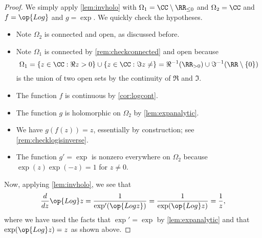 \begin{proof}
	We simply apply \autoref{lem:invholo} with $\Omega_1=\CC\setminus\RR_{\le0}$ and $\Omega_2=\CC$ and $f=\op{Log}$ and $g=\exp$. We quickly check the hypotheses.
	\begin{itemize}
		\item Note $\Omega_2$ is connected and open, as discussed before.
		\item Note $\Omega_1$ is connected by \autoref{rem:checkconnected} and open because
		\[\Omega_1=\{z\in\CC:\Re z>0\}\cup\{z\in\CC:\Im z\ne\}=\Re^{-1}(\RR_{>0})\cup\Im^{-1}(\RR\setminus\{0\})\]
		is the union of two open sets by the continuity of $\Re$ and $\Im$.
		\item The function $f$ is continuous by \autoref{cor:logcont}.
		\item The function $g$ is holomorphic on $\Omega_2$ by \autoref{lem:expanalytic}.
		\item We have $g(f(z))=z$, essentially by construction; see \autoref{rem:checklogisinverse}.
		\item The function $g'=\exp$ is nonzero everywhere on $\Omega_2$ because $\exp(z)\exp(-z)=1$ for $z\ne0$.
	\end{itemize}
	Now, applying \autoref{lem:invholo}, we see that
	\[\frac d{dz}\op{Log}z=\frac1{\exp'(\op{Log z})}=\frac1{\exp(\op{Log}z)}=\frac1z,\]
	where we have used the facts that $\exp'=\exp$ by \autoref{lem:expanalytic} and that $\exp(\op{Log}z)=z$ as shown above.
\end{proof}